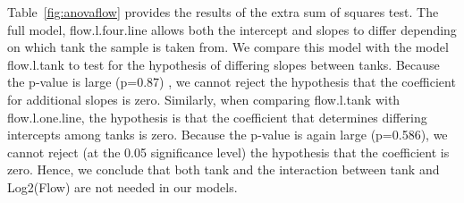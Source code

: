 Table~\ref{fig:anovaflow} provides the results of the extra sum of squares test. The full model,  flow.l.four.line allows both the intercept and slopes to differ depending on which tank the sample is taken from.
We compare this model with the model flow.l.tank to test for the hypothesis of differing slopes between tanks. Because the p-value is large (p=0.87) , we cannot reject the hypothesis that the coefficient for additional slopes is zero. Similarly, when comparing flow.l.tank with flow.l.one.line, the hypothesis is that the coefficient that determines differing intercepts among tanks is zero. Because the p-value is again large (p=0.586), we cannot reject (at the 0.05 significance level) the hypothesis that the coefficient is zero. Hence, we conclude that both tank and the interaction between tank and Log2(Flow) are not needed in our models.









